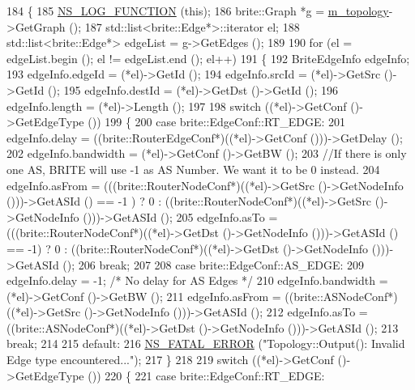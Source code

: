 \begin{DoxyCode}
184 \{
185   \hyperlink{log-macros-disabled_8h_a90b90d5bad1f39cb1b64923ea94c0761}{NS\_LOG\_FUNCTION} (\textcolor{keyword}{this});
186   brite::Graph *\hyperlink{buildings__pathloss_8m_a93aaa9148bded292f2e18b0907fce426}{g} = \hyperlink{classns3_1_1BriteTopologyHelper_a1756fddb45019b7ed9a9e3bbc0e479c6}{m\_topology}->GetGraph ();
187   std::list<brite::Edge*>::iterator el;
188   std::list<brite::Edge*> edgeList = g->GetEdges ();
189 
190   \textcolor{keywordflow}{for} (el = edgeList.begin (); el != edgeList.end (); el++)
191     \{
192       BriteEdgeInfo edgeInfo;
193       edgeInfo.edgeId = (*el)->GetId ();
194       edgeInfo.srcId = (*el)->GetSrc ()->GetId ();
195       edgeInfo.destId = (*el)->GetDst ()->GetId ();
196       edgeInfo.length = (*el)->Length ();
197 
198       \textcolor{keywordflow}{switch} ((*el)->GetConf ()->GetEdgeType ())
199         \{
200         \textcolor{keywordflow}{case} brite::EdgeConf::RT\_EDGE:
201           edgeInfo.delay = ((brite::RouterEdgeConf*)((*el)->GetConf ()))->GetDelay ();
202           edgeInfo.bandwidth = (*el)->GetConf ()->GetBW ();
203           \textcolor{comment}{//If there is only one AS, BRITE will use -1 as AS Number.  We want it to be 0 instead.}
204           edgeInfo.asFrom = (((brite::RouterNodeConf*)((*el)->GetSrc ()->GetNodeInfo ()))->GetASId () == -1
      ) ? 0 : ((brite::RouterNodeConf*)((*el)->GetSrc ()->GetNodeInfo ()))->GetASId ();
205           edgeInfo.asTo = (((brite::RouterNodeConf*)((*el)->GetDst ()->GetNodeInfo ()))->GetASId () == -1) 
      ? 0 : ((brite::RouterNodeConf*)((*el)->GetDst ()->GetNodeInfo ()))->GetASId ();
206           \textcolor{keywordflow}{break};
207 
208         \textcolor{keywordflow}{case} brite::EdgeConf::AS\_EDGE:
209           edgeInfo.delay =  -1;     \textcolor{comment}{/* No delay for AS Edges */}
210           edgeInfo.bandwidth = (*el)->GetConf ()->GetBW ();
211           edgeInfo.asFrom = ((brite::ASNodeConf*)((*el)->GetSrc ()->GetNodeInfo ()))->GetASId ();
212           edgeInfo.asTo = ((brite::ASNodeConf*)((*el)->GetDst ()->GetNodeInfo ()))->GetASId ();
213           \textcolor{keywordflow}{break};
214 
215         \textcolor{keywordflow}{default}:
216           \hyperlink{group__fatal_ga5131d5e3f75d7d4cbfd706ac456fdc85}{NS\_FATAL\_ERROR} (\textcolor{stringliteral}{"Topology::Output(): Invalid Edge type encountered..."});
217         \}
218 
219       \textcolor{keywordflow}{switch} ((*el)->GetConf ()->GetEdgeType ())
220         \{
221         \textcolor{keywordflow}{case} brite::EdgeConf::RT\_EDGE:

\end{DoxyCode}

